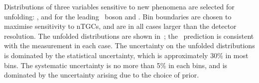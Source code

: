 Distributions of three variables sensitive to new phenomena are selected for
unfolding: \ptZ, and \deltaPhiLL for the leading \Z\ boson and \mZZ. Bin
boundaries are chosen to maximise sensitivity to nTGCs, and are in all cases
larger than the detector resolution. The unfolded distributions are shown
in~; the \sm\ prediction is consistent with the
measurement in each case. The uncertainty on the unfolded distributions is dominated by the
statistical uncertainty, which is approximately 30\% in most bins. The
systematic uncertainty is no more than 5\% in each bins, and is dominated by the
uncertainty arising due to the choice of prior.
